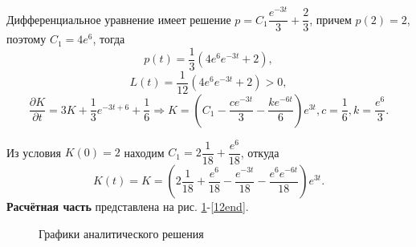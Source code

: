 \documentclass[a4paper, 12pt]{article}
\newcommand{\df}[2]{\frac{\partial #1}{\partial #2}}
\begin{document}
Дифференциальное уравнение имеет решение $p=C_1 \dfrac{e^{-3t}}{3} +\dfrac{2}{3}$, причем $p(2)=2$, поэтому $C_1=4 e^{6}$, тогда
\begin{equation}
    p(t)=\dfrac{1}{3}\left(4e^{6} e^{-3t}+2 \right) ,
\end{equation}
\begin{equation}
    L(t)=\dfrac{1}{12}\left(4e^{6} e^{-3t}+2 \right)>0,
\end{equation}
\begin{equation}
    \df{K}{t}=3K+\dfrac{1}{3} e^{-3t+6}+\dfrac{1}{6} \Rightarrow K=\left(C_1- \dfrac{c e^{-3t}}{3}- \dfrac{k e^{-6t}}{6}\right) e^{3t},c=\dfrac{1}{6},k=\dfrac{e^{6}}{3}.
\end{equation}

Из условия $K(0)=2$ находим $C_1=2\dfrac{1}{18}+\dfrac{e^{6}}{18}$, откуда 
\begin{equation}
    K(t)=K=\left(2\dfrac{1}{18}+\dfrac{e^{6}}{18}- \dfrac{e^{-3t}}{18}-\dfrac{e^{6} e^{-6t}}{18}\right) e^{3t}.
\end{equation}
{\bf Расчётная часть} представлена на рис. \ref{12beg}-\ref{12end}.
\begin{figure}[h]
    \noindent{}
    \caption{Графики аналитического решения}
    \label{12beg}
\end{figure}
\end{document}
